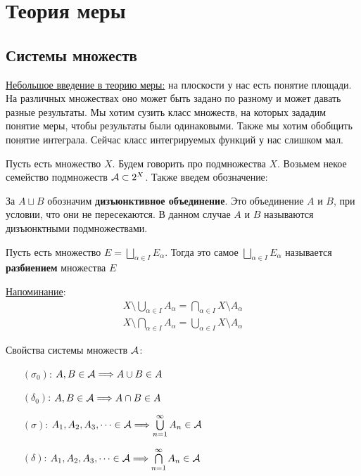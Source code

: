 \chapter{Теория меры}
\section{Системы множеств}
\underline{Небольшое введение в теорию меры:} на плоскости у нас есть понятие площади. На 
различных множествах оно может быть задано по разному и может давать разные результаты. Мы хотим сузить класс множеств, на которых 
зададим понятие меры, чтобы результаты были одинаковыми. Также мы хотим обобщить понятие интеграла. Сейчас класс интегрируемых функций у нас
слишком мал. 

Пусть есть множество $X$. Будем говорить про подмножества $X$. Возьмем некое семейство подмножеств $\mathcal{A} \subset 2^X$. Также введем обозначение:

\begin{conj}
  За $A \sqcup B$ обозначим \textbf{дизъюнктивное объединение}. Это объединение $A$ и $B$, при условии, что они не пересекаются. 
  В данном случае $A$ и $B$ называются дизъюнктными подмножествами.
\end{conj}

\begin{conj}
  Пусть есть множество $E = \bigsqcup\limits_{\alpha \in I} E_\alpha$. Тогда это самое $\bigsqcup\limits_{\alpha \in I} E_\alpha$ называется 
  \textbf{разбиением} множества $E$
\end{conj}

\underline{Напоминание}: 
\begin{gather*}
  X \setminus \bigcup\limits_{\alpha \in I} A_\alpha = \bigcap\limits_{\alpha \in I} X \setminus A_\alpha \\
  X \setminus \bigcap\limits_{\alpha \in I} A_\alpha = \bigcup\limits_{\alpha \in I} X \setminus A_\alpha
\end{gather*}

Свойства системы множеств $\mathcal{A}$:
\begin{enumerate}
  \item[$(\sigma_0)$:] $A, B \in \mathcal{A} \Longrightarrow A \cup B \in A$
  \item[$(\delta_0)$:] $A, B \in \mathcal{A} \Longrightarrow A \cap B \in A$
  \item[$(\sigma)$:] $A_1, A_2, A_3, \dots \in \mathcal{A} \Longrightarrow \bigcup\limits_{n=1}^{\infty} A_n \in \mathcal{A}$
  \item[$(\delta)$:] $A_1, A_2, A_3, \dots \in \mathcal{A} \Longrightarrow \bigcap\limits_{n=1}^{\infty} A_n \in \mathcal{A}$
\end{enumerate}

